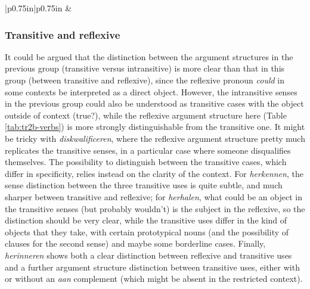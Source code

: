 \documentclass[
]{book}
\begin{document}
\begin{longtable}[c]{|p{0.75in}|p{0.75in}}
 &  \\

\noalign{\global\setlength{\arrayrulewidth}{2pt}}

\end{longtable}

\hypertarget{transitive-and-reflexive}{%
\subsubsection{Transitive and reflexive}\label{transitive-and-reflexive}}

It could be argued that the distinction between the argument structures in the previous group (transitive versus intransitive) is more clear than that in this group (between transitive and reflexive), since the reflexive pronoun \emph{could} in some contexts be interpreted as a direct object. However, the intransitive senses in the previous group could also be understood as transitive cases with the object outside of context (true?), while the reflexive argument structure here (Table \ref{tab:tr2b-verbs}) is more strongly distinguishable from the transitive one. It might be tricky with \emph{diskwalificeren}, where the reflexive argument structure pretty much replicates the transitive senses, in a particular case where someone disqualifies themselves. The possibility to distinguish between the transitive cases, which differ in specificity, relies instead on the clarity of the context. For \emph{herkennen}, the sense distinction between the three transitive uses is quite subtle, and much sharper between transitive and reflexive; for \emph{herhalen}, what could be an object in the transitive senses (but probably wouldn't) is the subject in the reflexive, so the distinction should be very clear, while the transitive uses differ in the kind of objects that they take, with certain prototypical nouns (and the possibility of clauses for the second sense) and maybe some borderline cases. Finally, \emph{herinneren} shows both a clear distinction between reflexive and transitive uses and a further argument structure distinction between transitive uses, either with or without an \emph{aan} complement (which might be absent in the restricted context).
\end{document}

